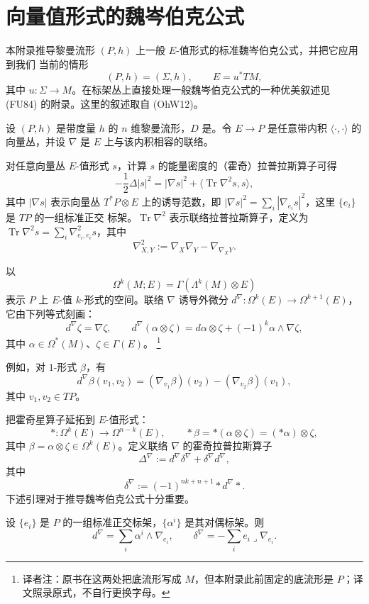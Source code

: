 \chapter{向量值形式的魏岑伯克公式}
\label{app:weizenbock}
\appendixsectionlessstatements

本附录推导黎曼流形 $(P,h)$ 上一般 $E$-值形式的标准魏岑伯克公式，并把它应用到我们
当前的情形
\[
 (P,h)=(\Sigma,h),\qquad E=u^*TM,
\]
其中 $u\colon\Sigma\to M$。在标架丛上直接处理一般魏岑伯克公式的一种优美叙述见
(FU84) 的附录。这里的叙述取自 (OhW12)。

设 $(P,h)$ 是带度量 $h$ 的 $n$ 维黎曼流形，$D$ 是\termLeviCivitaConnection{}。令
$E\to P$ 是任意带内积 $\langle\cdot,\cdot\rangle$ 的向量丛，并设 $\nabla$ 是 $E$
上与该内积相容的联络。

对任意向量丛 $E$-值形式 $s$，计算 $s$ 的能量密度的（霍奇）拉普拉斯算子可得
\[
 -\frac12\Delta|s|^2=|\nabla s|^2+
 \langle\operatorname{Tr}\nabla^2s,s\rangle,
\]
其中 $|\nabla s|$ 表示向量丛 $T^*P\otimes E$ 上的诱导范数，即
$|\nabla s|^2=\sum_i|\nabla_{e_i}s|^2$，这里 $\{e_i\}$ 是 $TP$ 的一组标准正交
标架。$\operatorname{Tr}\nabla^2$ 表示联络拉普拉斯算子，定义为
$\operatorname{Tr}\nabla^2s=\sum_i\nabla^2_{e_i,e_i}s$，其中
\[
 \nabla^2_{X,Y}:=\nabla_X\nabla_Y-\nabla_{\nabla_XY}.
\]

以
\[
 \Omega^k(M;E)=\Gamma(\Lambda^k(M)\otimes E)
\]
表示 $P$ 上 $E$-值 $k$-形式的空间。联络 $\nabla$ 诱导外微分
$d^\nabla\colon\Omega^k(E)\to\Omega^{k+1}(E)$，它由下列等式刻画：
\[
 d^\nabla\zeta=\nabla\zeta,
 \qquad
 d^\nabla(\alpha\otimes\zeta)
 =d\alpha\otimes\zeta+(-1)^k\alpha\wedge\nabla\zeta,
\]
其中 $\alpha\in\Omega^*(M)$、$\zeta\in\Gamma(E)$。
\footnote{译者注：原书在这两处把底流形写成 $M$，但本附录此前固定的底流形是
$P$；译文照录原式，不自行更换字母。}

例如，对 $1$-形式 $\beta$，有
\[
 d^\nabla\beta(v_1,v_2)
 =(\nabla_{v_1}\beta)(v_2)-(\nabla_{v_2}\beta)(v_1),
\]
其中 $v_1,v_2\in TP$。

把霍奇星算子延拓到 $E$-值形式：
\[
 *\colon\Omega^k(E)\longrightarrow\Omega^{n-k}(E),
 \qquad
 *\beta=*(\alpha\otimes\zeta)=(*\alpha)\otimes\zeta,
\]
其中 $\beta=\alpha\otimes\zeta\in\Omega^k(E)$。定义联络 $\nabla$ 的霍奇拉普拉斯算子
\[
 \Delta^\nabla:=d^\nabla\delta^\nabla+\delta^\nabla d^\nabla,
\]
其中
\[
 \delta^\nabla:=(-1)^{nk+n+1}*d^\nabla*.
\]
下述引理对于推导魏岑伯克公式十分重要。

\begin{lemma}
\label{lem:app-a-exterior-codifferential}
设 $\{e_i\}$ 是 $P$ 的一组标准正交标架，$\{\alpha^i\}$ 是其对偶标架。则
\[
 d^\nabla=\sum_i\alpha^i\wedge\nabla_{e_i},
 \qquad
 \delta^\nabla=-\sum_i e_i\mathbin{\lrcorner}\nabla_{e_i}.
\]
\end{lemma}


